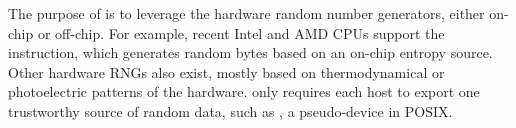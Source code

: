 The purpose of  is to leverage the hardware random number generators,
either on-chip or off-chip.
For example, recent Intel and AMD CPUs support the  instruction,
which generates random bytes based on an on-chip entropy source.
Other hardware RNGs also exist, mostly based on thermodynamical or photoelectric patterns of the hardware.
\graphene{} only requires each host to export
one trustworthy source of random data,
such as , a pseudo-device in POSIX.




%
%
%
